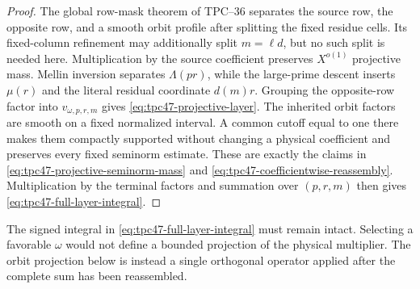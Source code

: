 \begin{proof}
The global row-mask theorem of TPC--36 separates the source row, the
opposite row, and a smooth orbit profile after splitting the fixed
residue cells.  Its fixed-column refinement may additionally split
\(m=\ell d\), but no such split is needed here.  Multiplication by the
source coefficient preserves \(X^{o(1)}\) projective mass.  Mellin
inversion separates \(\Lambda(pr)\), while the large-prime descent
inserts \(\mu(r)\) and the literal residual coordinate \(d(m)r\).
Grouping the opposite-row factor into \(v_{\omega,p,r,m}\) gives
\eqref{eq:tpc47-projective-layer}.  The inherited orbit factors are
smooth on a fixed normalized interval.  A common cutoff equal to one
there makes them compactly supported without changing a physical
coefficient and preserves every fixed seminorm estimate.  These are
exactly the claims in \eqref{eq:tpc47-projective-seminorm-mass} and
\eqref{eq:tpc47-coefficientwise-reassembly}.  Multiplication by the
terminal factors and summation over \((p,r,m)\) then gives
\eqref{eq:tpc47-full-layer-integral}.
\end{proof}

The signed integral in \eqref{eq:tpc47-full-layer-integral} must remain
intact.  Selecting a favorable \(\omega\) would not define a bounded
projection of the physical multiplier.  The orbit projection below is
instead a single orthogonal operator applied after the complete sum has
been reassembled.
